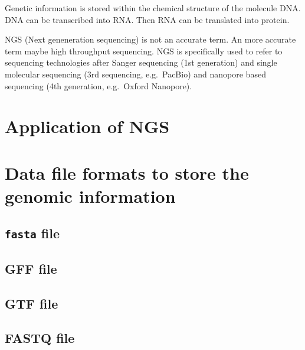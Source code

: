 \documentclass[]{book}
\begin{document}
Genetic information is stored within the chemical structure of the molecule DNA. DNA can be transcribed into RNA. Then RNA can be translated into protein.

NGS (Next geneneration sequencing) is not an accurate term. An more accurate term maybe high throughput sequencing. NGS is specifically used to refer to sequencing technologies after Sanger sequencing (1st generation) and single molecular sequencing (3rd sequencing, e.g.~PacBio) and nanopore based sequencing (4th generation, e.g.~Oxford Nanopore).

\hypertarget{application-of-ngs}{%
\section{Application of NGS}\label{application-of-ngs}}

\hypertarget{section-2}{%
\section{}\label{section-2}}

\hypertarget{data-file-formats-to-store-the-genomic-information}{%
\section{Data file formats to store the genomic information}\label{data-file-formats-to-store-the-genomic-information}}

\hypertarget{fasta-file}{%
\subsection{\texorpdfstring{\texttt{fasta} file}{fasta file}}\label{fasta-file}}

\hypertarget{gff-file}{%
\subsection{GFF file}\label{gff-file}}

\hypertarget{gtf-file}{%
\subsection{GTF file}\label{gtf-file}}

\hypertarget{fastq-file}{%
\subsection{FASTQ file}\label{fastq-file}}
\end{document}

